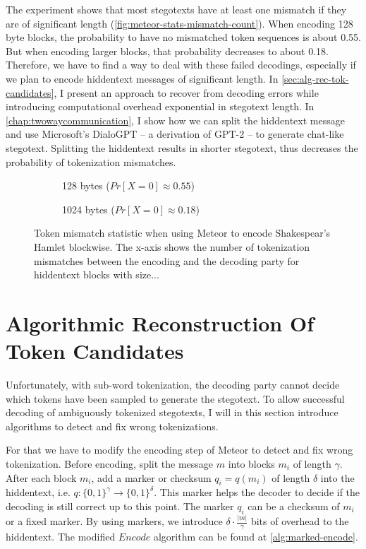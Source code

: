 The experiment shows that most stegotexts have at least one mismatch if they are of significant length (\autoref{fig:meteor-stats-mismatch-count}).
When encoding 128 byte blocks, the probability to have no mismatched token sequences is about 0.55.
But when encoding larger blocks, that probability decreases to about 0.18.
Therefore, we have to find a way to deal with these failed decodings, especially if we plan to encode hiddentext messages of significant length.
In \autoref{sec:alg-rec-tok-candidates}, I present an approach to recover from decoding errors while introducing computational overhead exponential in stegotext length. 
In \autoref{chap:twowaycommunication}, I show how we can split the hiddentext message and use Microsoft's DialoGPT -- a derivation of GPT-2 -- to generate chat-like stegotext.
Splitting the hiddentext results in shorter stegotext, thus decreases the probability of tokenization mismatches.

\begin{figure}[htbp]%
	\begin{subfigure}{.5\textwidth}%
		\centering%
	    \resizebox{0.8\linewidth}{!}{%
		}%
		\caption{128 bytes ($Pr[X=0] \approx 0.55$)}%
	\end{subfigure}%
	\begin{subfigure}{.5\textwidth}%
		\centering%
	    \resizebox{0.8\linewidth}{!}{%
		}%
		\caption{1024 bytes ($Pr[X=0] \approx 0.18$)}%
	\end{subfigure}%
	\caption{Token mismatch statistic when using Meteor to encode Shakespear's Hamlet blockwise. The x-axis shows the number of tokenization mismatches between the encoding and the decoding party for hiddentext blocks with size...}
	\label{fig:meteor-stats-mismatch-count}	
\end{figure}

\section{Algorithmic Reconstruction Of Token Candidates}
\label{sec:alg-rec-tok-candidates}

Unfortunately, with sub-word tokenization, the decoding party cannot decide which tokens have been sampled to generate the stegotext.
To allow successful decoding of ambiguously tokenized stegotexts, I will in this section introduce algorithms to detect and fix wrong tokenizations. 


For that we have to modify the encoding step of Meteor to detect and fix wrong tokenization.
Before encoding, split the message $m$ into blocks $m_i$ of length $\gamma$.
After each block $m_i$, add a marker or checksum $q_i = q(m_i)$ of length $\delta$ into the hiddentext, i.e. $q \colon \{ 0,1 \}^\gamma \rightarrow \{ 0,1 \}^\delta$.
This marker helps the decoder to decide if the decoding is still correct up to this point.
The marker $q_i$ can be a checksum of $m_i$ or a fixed marker.
By using markers, we introduce $\delta \cdot \frac{|m|}{\gamma}$ bits of overhead to the hiddentext.
The modified $Encode$ algorithm can be found at \autoref{alg:marked-encode}.

